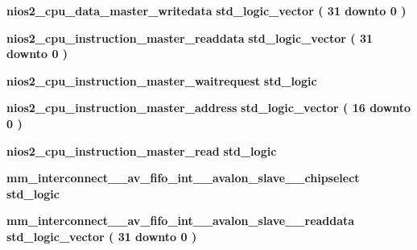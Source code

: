 \begin{DoxyCompactItemize}
\item 
{\bf nios2\+\_\+cpu\+\_\+data\+\_\+master\+\_\+writedata} {\bfseries \textcolor{comment}{std\+\_\+logic\+\_\+vector}\textcolor{vhdlchar}{ }\textcolor{vhdlchar}{(}\textcolor{vhdlchar}{ }\textcolor{vhdlchar}{ } \textcolor{vhdldigit}{31} \textcolor{vhdlchar}{ }\textcolor{keywordflow}{downto}\textcolor{vhdlchar}{ }\textcolor{vhdlchar}{ } \textcolor{vhdldigit}{0} \textcolor{vhdlchar}{ }\textcolor{vhdlchar}{)}\textcolor{vhdlchar}{ }} 
\item 
{\bf nios2\+\_\+cpu\+\_\+instruction\+\_\+master\+\_\+readdata} {\bfseries \textcolor{comment}{std\+\_\+logic\+\_\+vector}\textcolor{vhdlchar}{ }\textcolor{vhdlchar}{(}\textcolor{vhdlchar}{ }\textcolor{vhdlchar}{ } \textcolor{vhdldigit}{31} \textcolor{vhdlchar}{ }\textcolor{keywordflow}{downto}\textcolor{vhdlchar}{ }\textcolor{vhdlchar}{ } \textcolor{vhdldigit}{0} \textcolor{vhdlchar}{ }\textcolor{vhdlchar}{)}\textcolor{vhdlchar}{ }} 
\item 
{\bf nios2\+\_\+cpu\+\_\+instruction\+\_\+master\+\_\+waitrequest} {\bfseries \textcolor{comment}{std\+\_\+logic}\textcolor{vhdlchar}{ }} 
\item 
{\bf nios2\+\_\+cpu\+\_\+instruction\+\_\+master\+\_\+address} {\bfseries \textcolor{comment}{std\+\_\+logic\+\_\+vector}\textcolor{vhdlchar}{ }\textcolor{vhdlchar}{(}\textcolor{vhdlchar}{ }\textcolor{vhdlchar}{ } \textcolor{vhdldigit}{16} \textcolor{vhdlchar}{ }\textcolor{keywordflow}{downto}\textcolor{vhdlchar}{ }\textcolor{vhdlchar}{ } \textcolor{vhdldigit}{0} \textcolor{vhdlchar}{ }\textcolor{vhdlchar}{)}\textcolor{vhdlchar}{ }} 
\item 
{\bf nios2\+\_\+cpu\+\_\+instruction\+\_\+master\+\_\+read} {\bfseries \textcolor{comment}{std\+\_\+logic}\textcolor{vhdlchar}{ }} 
\item 
{\bf mm\+\_\+interconnect\+\_\+\_\+av\+\_\+fifo\+\_\+int\+\_\+\_\+avalon\+\_\+slave\+\_\+\_\+chipselect} {\bfseries \textcolor{comment}{std\+\_\+logic}\textcolor{vhdlchar}{ }} 
\item 
{\bf mm\+\_\+interconnect\+\_\+\_\+av\+\_\+fifo\+\_\+int\+\_\+\_\+avalon\+\_\+slave\+\_\+\_\+readdata} {\bfseries \textcolor{comment}{std\+\_\+logic\+\_\+vector}\textcolor{vhdlchar}{ }\textcolor{vhdlchar}{(}\textcolor{vhdlchar}{ }\textcolor{vhdlchar}{ } \textcolor{vhdldigit}{31} \textcolor{vhdlchar}{ }\textcolor{keywordflow}{downto}\textcolor{vhdlchar}{ }\textcolor{vhdlchar}{ } \textcolor{vhdldigit}{0} \textcolor{vhdlchar}{ }\textcolor{vhdlchar}{)}\textcolor{vhdlchar}{ }} 
\item 

\end{DoxyCompactItemize}

